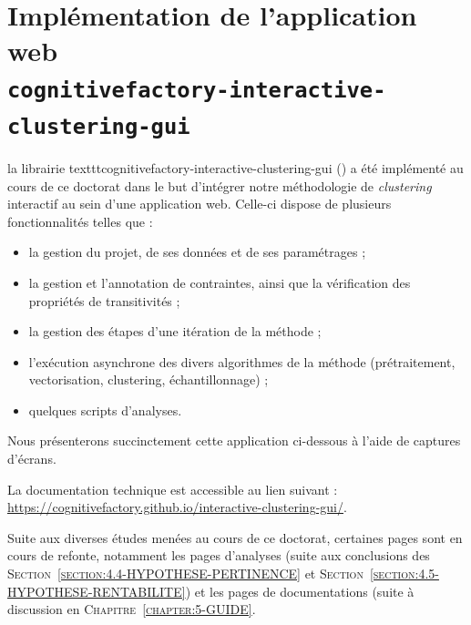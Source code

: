 \section{Implémentation de l'application web \\ \texttt{cognitivefactory-interactive-clustering-gui}}
\label{annex:C.4-DESCRIPTION-IMPLEMENTATION-INTERACTIVE-CLUSTERING-GUI}

	la librairie texttt{cognitivefactory-interactive-clustering-gui} (\cite{schild-etal:2022:cognitivefactory-interactiveclusteringgui}) a été implémenté au cours de ce doctorat dans le but d'intégrer notre méthodologie de \textit{clustering} interactif au sein d'une application web.
	Celle-ci dispose de plusieurs fonctionnalités telles que :
	\begin{itemize}
		\item la gestion du projet, de ses données et de ses paramétrages ;
		\item la gestion et l'annotation de contraintes, ainsi que la vérification des propriétés de transitivités ;
		\item la gestion des étapes d'une itération de la méthode ;
		\item l'exécution asynchrone des divers algorithmes de la méthode (prétraitement, vectorisation, clustering, échantillonnage) ;
		\item quelques scripts d'analyses.
	\end{itemize}
	
	Nous présenterons succinctement cette application ci-dessous à l'aide de captures d'écrans.
	
	\begin{leftBarInformation}
		La documentation technique est accessible au lien suivant : \url{https://cognitivefactory.github.io/interactive-clustering-gui/}.
	\end{leftBarInformation}
	
	\begin{leftBarAuthorOpinion}
		Suite aux diverses études menées au cours de ce doctorat, certaines pages sont en cours de refonte, notamment les pages d'analyses (suite aux conclusions des \textsc{Section~\ref{section:4.4-HYPOTHESE-PERTINENCE}} et \textsc{Section~\ref{section:4.5-HYPOTHESE-RENTABILITE}}) et les pages de documentations (suite à discussion en \textsc{Chapitre~\ref{chapter:5-GUIDE}}.
	\end{leftBarAuthorOpinion}
	
